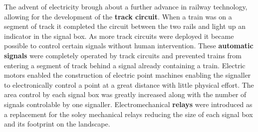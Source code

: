 \begin{comment}
Around about the same time as the introduction of the semaphore signal, the system
for controlling the signals went under drastic change. The Policemen were
replaced with professional \textbf{Signallers} whose job was specifically to
manage the railways. A system of pulleys, wires and levers was also devised
to allow multiple signals and points to be controlled from a central
position. This central position became known as a \textbf{signal box} and was
manned by one or more signallers. This centralisation allowed for further
safety mechanisms to be installed. One in particular, namely the \textbf{interlocking},
is of interest to us. The interlocking physically locked levers if they were
unsafe to move.
\end{comment}
The advent of electricity brough about a further advance in railway technology, allowing for the development of the \textbf{track circuit}. When a train was on a segment of track it completed the circuit between the two rails and light up an indicator in the signal box. As more track circuits were deployed it became possible to control certain signals without human intervention. These \textbf{automatic signals} were completely operated by track circuits and prevented trains from entering a segment of track behind a signal already containing a train. Electric motors enabled the construction of electric point machines enabling the signaller to electronically control a point at a great distance with little physical effort. The area control by each signal box was greatly increased along with the number of signals controlable by one signaller. Electromechanical \textbf{relays} were introduced as a replacement for the soley mechanical relays reducing the size of each signal box and its footprint on the landscape.
\begin{comment}
The next leap in railway technology came from the invention of the electronic
\textbf{track circuit}. These would activate an indicator in the signal box if a
segment of track was occupied by a train. As more and more track circuits
became installed it was no longer necessary to have human intervention to
control certain signals. \textbf{Automatic signals} were introduced which
operated completely by track circuits without any intervention from human
signallers. Around this time \textbf{electric point machines} were introduced
removing a large amount of physical work performed by signallers allowing for
a greater area of control for each signaller.  Around this time
electromechanical \textbf{relays} began to replace purely mechanical relays
reducing the amount of space needed for a signal box.
\end{comment}

